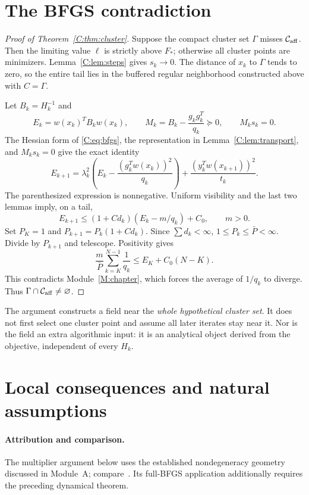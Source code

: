 \section{The BFGS contradiction}
\begin{proof}[Proof of Theorem~\ref{C:thm:cluster}]
Suppose the compact cluster set $\Gamma$ misses $\mathcal C_{\rm aff}$. Then the limiting value $\ell$ is strictly above $F_*$; otherwise all cluster points are minimizers. Lemma~\ref{C:lem:steps} gives $s_k\to0$. The distance of $x_k$ to $\Gamma$ tends to zero, so the entire tail lies in the buffered regular neighborhood constructed above with $C=\Gamma$.

Let $B_k=H_k^{-1}$ and
\[
 E_k=w(x_k)^TB_kw(x_k),\qquad
 M_k=B_k-\frac{g_kg_k^T}{q_k}\succeq0,\qquad M_ks_k=0.
\]
The Hessian form of \eqref{C:eq:bfgs}, the representation in Lemma~\ref{C:lem:transport}, and $M_ks_k=0$ give the exact identity
\begin{equation}\label{C:eq:energy}
 E_{k+1}=\lambda_k^2\left(E_k-\frac{(g_k^Tw(x_k))^2}{q_k}\right)
       +\frac{(y_k^Tw(x_{k+1}))^2}{t_k}.
\end{equation}
The parenthesized expression is nonnegative. Uniform visibility and the last two lemmas imply, on a tail,
\[
 E_{k+1}\le (1+C d_k)(E_k-m/q_k)+C_0,
 \qquad m>0.
\]
Set $P_K=1$ and $P_{k+1}=P_k(1+Cd_k)$. Since $\sum d_k<\infty$, $1\le P_k\le\bar P<\infty$. Divide by $P_{k+1}$ and telescope. Positivity gives
\[
 \frac{m}{\bar P}\sum_{k=K}^{N-1}\frac1{q_k}
 \le E_K+C_0(N-K).
\]
This contradicts Module~\ref{M:chapter}, which forces the average of $1/q_k$ to diverge. Thus $\Gamma\cap\mathcal C_{\rm aff}\ne\varnothing$.
\end{proof}

The argument constructs a field near the \emph{whole hypothetical cluster set}. It does not first select one cluster point and assume all later iterates stay near it. Nor is the field an extra algorithmic input: it is an analytical object derived from the objective, independent of every $H_k$.


\setcounter{section}{6}
\setcounter{theorem}{7}
\setcounter{equation}{16}
\section{Local consequences and natural assumptions}
\paragraph{Attribution and comparison.}
The multiplier argument below uses the established nondegeneracy geometry discussed in Module~A; compare~\cite{LW,BG}. Its full-BFGS application additionally requires the preceding dynamical theorem.

